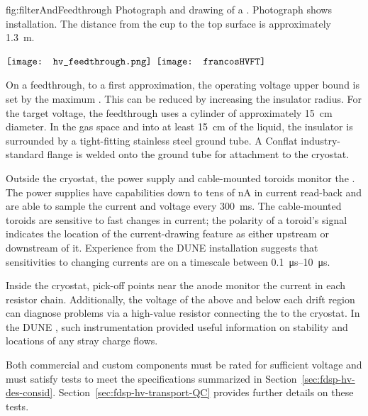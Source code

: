 \begin{dunefigure}{fig:filterAndFeedthrough}
{Photograph and drawing of a  \fdth{}. Photograph shows  installation. The distance from the cup to the top surface is approximately \SI{1.3}{\meter}. } 
\begin{minipage}{\textwidth}%
  \centering
 $\vcenter{\hbox{\texttt{[image: hv\_feedthrough.png]}}}$
 \hspace*{0.001\textwidth}  $\vcenter{\hbox{\texttt{[image: francosHVFT]}}}$
\end{minipage}
\end{dunefigure}

On a feedthrough, to a first approximation, the operating voltage upper bound is set by the maximum \efield{}. This \efield{} can be reduced by increasing the insulator radius.  For the target voltage, the feedthrough uses a  cylinder of approximately \SI{15}{cm} diameter.  In the gas space and into at least \SI{15}{\centi\meter} of the liquid, the insulator is surrounded by a tight-fitting stainless steel ground tube.  A %
Conflat industry-standard flange is welded onto the ground tube for attachment to the cryostat.

Outside the cryostat, the  power supply and cable-mounted toroids monitor the .    The power supplies 
have capabilities down to tens of \si{\nano\ampere} in current read-back 
and are able to sample the current and voltage every \SI{300}{\ms}.  The cable-mounted toroids are sensitive to fast changes in current;  
the polarity of a toroid's signal  
indicates the location of the current-drawing feature as either upstream or downstream of it.  Experience from the DUNE  installation suggests that sensitivities to changing currents %
are on a timescale between \SIrange{0.1}{10}{\micro\s}.

Inside the cryostat, pick-off points near the anode monitor the current  
in each resistor chain.  Additionally, the voltage of the  above and below each drift region can diagnose problems via a high-value resistor connecting the  to the cryostat.  In the DUNE , such instrumentation provided useful information on  stability and locations of %
any stray charge flows. %


Both commercial and custom  components must be rated for sufficient voltage and must satisfy tests to meet the specifications %
summarized in Section~\ref{sec:fdsp-hv-des-consid}.  Section~\ref{sec:fdsp-hv-transport-QC} provides further details on these tests.

